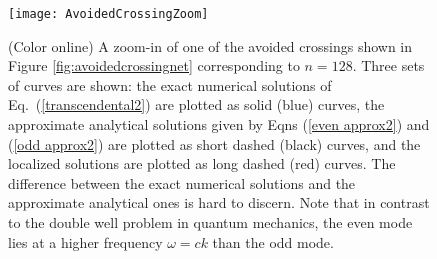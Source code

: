 \documentclass[twocolumn,english,pra,aps,superscriptaddress,floatfix]{revtex4-1}
\begin{document}
\begin{figure}
\texttt{[image: AvoidedCrossingZoom]}
\caption{(Color online) A zoom-in of one of the avoided
crossings shown in Figure \ref{fig:avoidedcrossingnet} corresponding to $n=128$. Three sets of curves are shown:
the exact numerical solutions of Eq.\ (\ref{transcendental2}) are plotted as solid (blue) curves, the approximate analytical solutions given by Eqns (\ref{even approx2}) and (\ref{odd approx2}) are plotted as short dashed (black) curves, and the localized solutions are plotted as long dashed (red) curves. The difference between the exact numerical solutions and the approximate analytical ones is hard to discern.
Note that in contrast to the double well problem in quantum mechanics, the even mode lies at a higher  frequency $\omega=ck$ than the odd mode.}
\label{fig:avoidedcrossing}
\end{figure}
\end{document}

